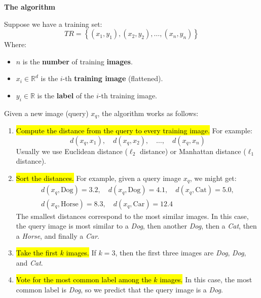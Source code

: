 \highspace
\begin{flushleft}
    \textcolor{Green3}{ \textbf{The algorithm}}
\end{flushleft}
Suppose we have a training set:
\begin{equation*}
    TR = \left\{\left(x_1, y_1\right), \left(x_2, y_2\right), \ldots, \left(x_n, y_n\right)\right\}
\end{equation*}
Where:
\begin{itemize}
    \item $n$ is the \textbf{number} of training \textbf{images}.
    \item $x_i \in \mathbb{R}^{d}$ is the $i$-th \textbf{training image} (flattened).
    \item $y_i \in \mathbb{R}$ is the \textbf{label} of the $i$-th training image.
\end{itemize}
Given a new image (query) $x_q$, the algorithm works as follows:
\begin{enumerate}
    \item \hl{Compute the distance from the query to every training image.} For example:
    \begin{equation*}
        d\left(x_q, x_1\right), \quad d\left(x_q, x_2\right), \quad \ldots, \quad d\left(x_q, x_n\right)
    \end{equation*}
    Usually we use Euclidean distance ($\ell_2$ distance) or Manhattan distance ($\ell_1$ distance).


    \item \hl{Sort the distances.} For example, given a query image $x_q$, we might get:
    \begin{gather*}
        d\left(x_q, \text{Dog}\right) = 3.2, \quad d\left(x_q, \text{Dog}\right) = 4.1, \quad d\left(x_q, \text{Cat}\right) = 5.0, \\
        d\left(x_q, \text{Horse}\right) = 8.3, \quad d\left(x_q, \text{Car}\right) = 12.4
    \end{gather*}
    The smallest distances correspond to the most similar images. In this case, the query image is most similar to a \emph{Dog}, then another \emph{Dog}, then a \emph{Cat}, then a \emph{Horse}, and finally a \emph{Car}.


    \item \hl{Take the first $k$ images.} If $k=3$, then the first three images are \emph{Dog}, \emph{Dog}, and \emph{Cat}.
    

    \item \hl{Vote for the most common label among the $k$ images.} In this case, the most common label is \emph{Dog}, so we predict that the query image is a \emph{Dog}.
\end{enumerate}
